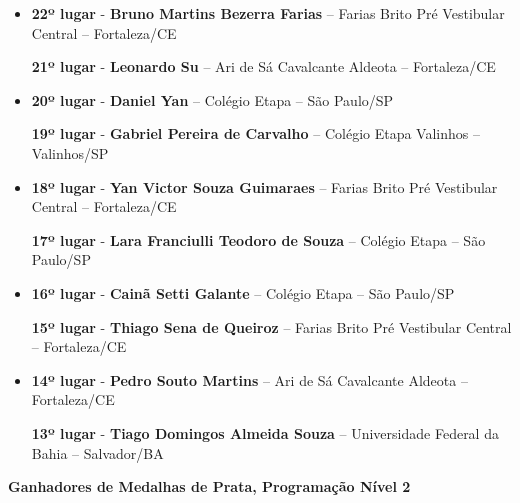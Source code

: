 \documentclass{article}
\begin{document}
\begin{itemize}
\item
\textbf{22º lugar} - \textbf{Bruno Martins Bezerra Farias} – Farias Brito Pré Vestibular Central – Fortaleza/CE


\textbf{21º lugar} - \textbf{Leonardo Su} – Ari de Sá Cavalcante Aldeota – Fortaleza/CE



\item
\textbf{20º lugar} - \textbf{Daniel Yan} – Colégio Etapa – São Paulo/SP


\textbf{19º lugar} - \textbf{Gabriel Pereira de Carvalho} – Colégio Etapa Valinhos – Valinhos/SP



\item
\textbf{18º lugar} - \textbf{Yan Victor Souza Guimaraes} – Farias Brito Pré Vestibular Central – Fortaleza/CE


\textbf{17º lugar} - \textbf{Lara Franciulli Teodoro de Souza} – Colégio Etapa – São Paulo/SP



\item
\textbf{16º lugar} - \textbf{Cainã Setti Galante} – Colégio Etapa – São Paulo/SP


\textbf{15º lugar} - \textbf{Thiago Sena de Queiroz} – Farias Brito Pré Vestibular Central – Fortaleza/CE



\item
\textbf{14º lugar} - \textbf{Pedro Souto Martins} – Ari de Sá Cavalcante Aldeota – Fortaleza/CE


\textbf{13º lugar} - \textbf{Tiago Domingos Almeida Souza} – Universidade Federal da Bahia – Salvador/BA



\end{itemize}

\textbf{\color{blue}Ganhadores de Medalhas de Prata, \color{black}Programação Nível 2}
\color{black}
\end{document}
